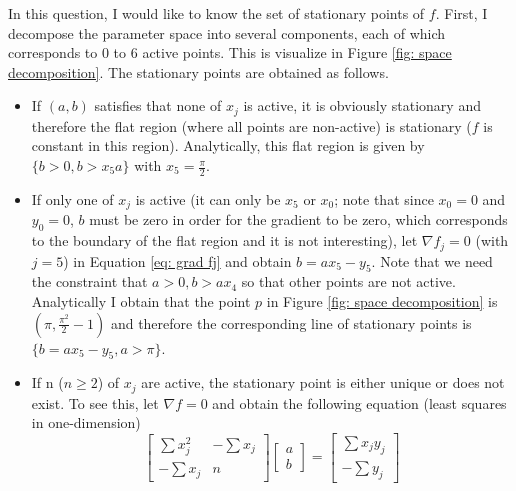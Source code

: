 \documentclass{article}
\begin{document}
In this question, I would like to know the set of stationary points of $ f $. First, I decompose the parameter space into several components, each of which corresponds to 0 to 6 active points. This is visualize in Figure \ref{fig: space decomposition}. The stationary points are obtained as follows.
\begin{itemize}
	\item If $ (a,b) $ satisfies that none of $ x_j $ is active, it is obviously stationary and therefore the flat region (where all points are non-active) is stationary ($ f $ is constant in this region). Analytically, this flat region is given by $ \{b>0, b>x_5 a\} $ with $ x_5 = \frac{\pi}{2} $.
	
	\item  If only one of $ x_j $ is active (it can only be $ x_5 $ or $ x_0 $; note that since $ x_0 = 0 $ and $ y_0 = 0 $, $ b $ must be zero in order for the gradient to be zero, which corresponds to the boundary of the flat region and it is not interesting), let $ \nabla f_j = 0 $ (with $ j=5 $) in Equation \ref{eq: grad fj} and obtain $ b = ax_5 - y_5 $. Note that we need the constraint that $ a>0, b>ax_4 $ so that other points are not active. Analytically I obtain that the point $ p $ in Figure \ref{fig: space decomposition} is $ (\pi, \frac{\pi^2}{2}-1) $ and therefore the corresponding line of stationary points is $ \{b = ax_5 - y_5, a>\pi\} $.
	
	\item If n ($ n\geq 2 $) of $ x_j $ are active, the stationary point is either unique or does not exist. To see this, let $ \nabla f = 0 $ and obtain the following equation (least squares in one-dimension) 
	\begin{equation} \label{eq: linear}
	\begin{bmatrix}
		\sum x_j^2 & -\sum x_j \\ -\sum x_j & n
	\end{bmatrix} 
	\begin{bmatrix}
		a\\ b
	\end{bmatrix} =
	\begin{bmatrix}
		\sum x_j y_j\\ -\sum y_j
	\end{bmatrix} 
	\end{equation}


\end{itemize}
\end{document}
